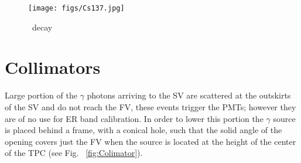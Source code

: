 \begin{figure}
	\begin{center}
	\texttt{[image: figs/Cs137.jpg]}%
		\caption{\label{fig:Cs} \Cs\ decay}
		\end{center}
	
	\end{figure} 

\section{Collimators} \label{sec:Col}
 
Large portion of the $\gamma$ photons arriving to the SV are scattered at the outskirts of the SV and do not reach the FV, these events trigger the PMTs; however they are of no use for ER band calibration. In order to lower this portion the $\gamma$ source is placed behind a frame, with a conical hole, such that the solid angle of the opening covers just the FV when the source is located at the height of the center of the TPC (see Fig. ~\ref{fig:Colimator}). 


